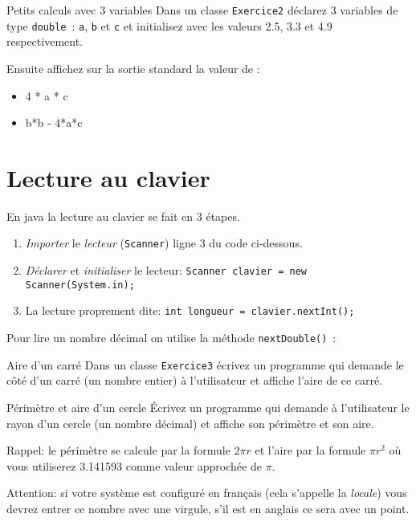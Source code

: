\documentclass[a4paper,11pt]{article}
\begin{document}
	\begin{Exercice}{Petits calculs avec 3 variables} 
		Dans un classe \texttt{Exercice2} déclarez 3 variables de type \texttt{double}~: 
		\texttt{a}, \texttt{b} et \texttt{c} et initialisez avec les valeurs 
		2.5, 3.3 et 4.9 respectivement.
		
		Ensuite affichez sur la sortie standard la valeur de :
		\begin{itemize}
		 	\item 4 * a * c
			\item b*b - 4*a*c
		\end{itemize} 
	\end{Exercice}


\newpage
\section{Lecture au clavier}


	En java la lecture au clavier se fait en 3 étapes.

	\begin{enumerate}
		\item \emph{Importer} le \emph{lecteur} (\texttt{Scanner}) ligne 3 du code ci-dessous.
		\item \emph{Déclarer} et \emph{initialiser} le lecteur:  \texttt{Scanner clavier = new Scanner(System.in);}
		\item La lecture proprement dite: \texttt{int longueur = clavier.nextInt();}
	\end{enumerate}


	Pour lire un nombre décimal on utilise la méthode \texttt{nextDouble()}~:
	


	\begin{Exercice}{Aire d'un carré}
		Dans un classe \texttt{Exercice3} écrivez un programme qui demande 
		le côté d'un carré (un nombre entier) à l'utilisateur et 
		affiche l'aire de ce carré.
	\end{Exercice}
	
	\begin{Exercice}{Périmètre et aire d'un cercle}
		\'Ecrivez un programme
		qui demande à l'utilisateur le rayon d'un cercle (un nombre décimal)
		et affiche son périmètre et son aire.
	
		Rappel: le périmètre se calcule par la formule $2\pi r$ et 
		l'aire par la formule $\pi r^2$ où vous utiliserez 3.141593 comme valeur
		approchée de $\pi$.
	
		Attention: si votre système est configuré en français (cela s'appelle la 
		\emph{locale}) 
		vous devrez entrer ce nombre avec une virgule, s'il est en anglais ce sera avec
		un point.
	\end{Exercice}
\end{document}
